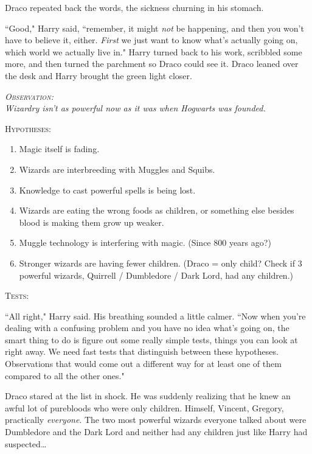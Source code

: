 Draco repeated back the words, the sickness churning in his stomach.

``Good," Harry said, ``remember, it might \emph{not} be happening, and then you won't have to believe it, either. \emph{First} we just want to know what's actually going on, which world we actually live in." Harry turned back to his work, scribbled some more, and then turned the parchment so Draco could see it. Draco leaned over the desk and Harry brought the green light closer.

\begin{center}\itshape
{\scshape Observation:}\\
Wizardry isn't as powerful now as it was when Hogwarts was founded. 

{\scshape Hypotheses:}
\begin{enumerate}[1.]\firmlist
\item Magic itself is fading.
\item Wizards are interbreeding with Muggles and Squibs.
\item Knowledge to cast powerful spells is being lost.
\item Wizards are eating the wrong foods as children, or something else besides blood is making them grow up weaker.
\item Muggle technology is interfering with magic. (Since 800 years ago?)
\item Stronger wizards are having fewer children. (Draco = only child? Check if 3 powerful wizards, Quirrell / Dumbledore / Dark Lord, had any children.)
\end{enumerate}
{\scshape Tests:}
\end{center}

``All right," Harry said. His breathing sounded a little calmer. ``Now when you're dealing with a confusing problem and you have no idea what's going on, the smart thing to do is figure out some really simple tests, things you can look at right away. We need fast tests that distinguish between these hypotheses. Observations that would come out a different way for at least one of them compared to all the other ones."

Draco stared at the list in shock. He was suddenly realizing that he knew an awful lot of purebloods who were only children. Himself, Vincent, Gregory, practically \emph{everyone}. The two most powerful wizards everyone talked about were Dumbledore and the Dark Lord and neither had any children just like Harry had suspected{\ldots}

